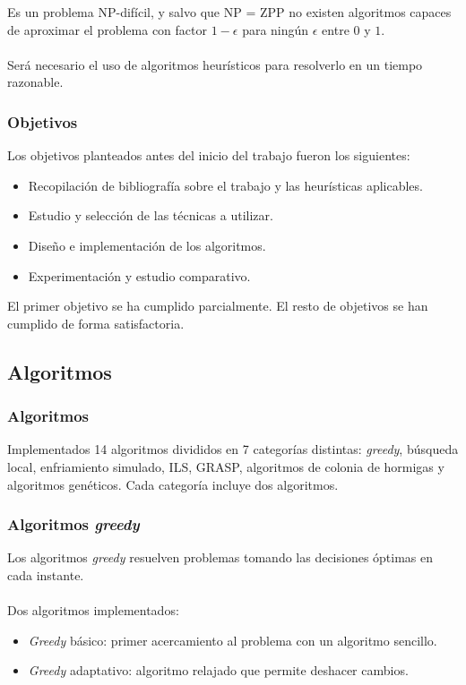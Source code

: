 \documentclass{beamer}
\begin{document}
\begin{frame}

  Es un problema NP-difícil, y salvo que NP = ZPP no existen algoritmos capaces de aproximar el
  problema con factor $1-\epsilon$ para ningún $\epsilon$ entre $0$ y $1$. \\~\\

  Será necesario el uso de algoritmos heurísticos para resolverlo en un tiempo razonable.
\end{frame}


\begin{frame}
  \frametitle{Objetivos}
  Los objetivos planteados antes del inicio del trabajo fueron los siguientes:
  \begin{itemize}
    \item Recopilación de bibliografía sobre el trabajo y las heurísticas aplicables.
    \item Estudio y selección de las técnicas a utilizar.
    \item Diseño e implementación de los algoritmos.
    \item Experimentación y estudio comparativo.
  \end{itemize}
  El primer objetivo se ha cumplido parcialmente. El resto de objetivos se han cumplido de forma satisfactoria.

\end{frame}


\subsection{Algoritmos}

\begin{frame}
  \frametitle{Algoritmos}
  Implementados 14 algoritmos divididos en 7 categorías distintas: \textit{greedy}, búsqueda local,
  enfriamiento simulado, ILS, GRASP, algoritmos de colonia de hormigas y algoritmos genéticos.
  Cada categoría incluye dos algoritmos.

\end{frame}

\begin{frame}
  \frametitle{Algoritmos \textit{greedy}}
  Los algoritmos \textit{greedy} resuelven problemas tomando las decisiones óptimas en cada instante. \\~\\

  Dos algoritmos implementados:
  \begin{itemize}
    \item \textit{Greedy} básico: primer acercamiento al problema con un algoritmo sencillo.
    \item \textit{Greedy} adaptativo: algoritmo relajado que permite deshacer cambios. \cite{grosso:2004}
  \end{itemize}

\end{frame}
\end{document}
